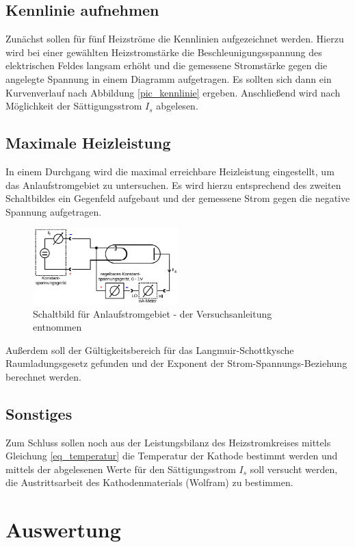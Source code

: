 \subsection{Kennlinie aufnehmen}
Zunächst sollen für fünf Heizströme die Kennlinien aufgezeichnet werden. Hierzu wird  bei einer gewählten Heizstromstärke die Beschleunigungsspannung des elektrischen Feldes langsam erhöht und die gemessene Stromstärke gegen die angelegte Spannung in einem Diagramm aufgetragen. Es sollten sich dann ein Kurvenverlauf nach Abbildung \ref{pic_kennlinie} ergeben. Anschließend wird nach Möglichkeit der Sättigungsstrom $I_s$ abgelesen.
\subsection{Maximale Heizleistung}
In einem Durchgang wird die maximal erreichbare Heizleistung eingestellt, um das Anlaufstromgebiet zu untersuchen. Es wird hierzu entsprechend des zweiten Schaltbildes ein Gegenfeld aufgebaut und der gemessene Strom gegen die negative Spannung aufgetragen.
\begin{figure}[H]
\includegraphics[width=0.5\textwidth]{pics/aufbau2.jpg}
\caption{Schaltbild für Anlaufstromgebiet - der Versuchsanleitung entnommen}
\end{figure}

Außerdem soll der Gültigkeitsbereich für das Langmuir-Schottkysche Raumladungsgesetz gefunden und der Exponent der Strom-Spannungs-Beziehung berechnet werden.
\subsection{Sonstiges}
Zum Schluss sollen noch aus der Leistungsbilanz des Heizstromkreises mittels Gleichung \eqref{eq_temperatur} die Temperatur der Kathode bestimmt werden und mittels der abgelesenen Werte für den Sättigungsstrom $I_s$ soll versucht werden, die Austrittsarbeit des Kathodenmaterials (Wolfram) zu bestimmen.

\section{Auswertung}
